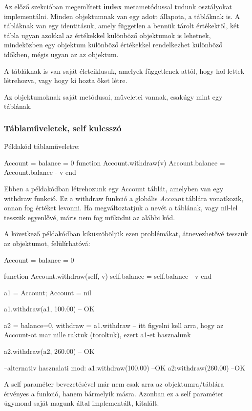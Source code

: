 Az előző szekcióban megemlített \detokenize{__}\textbf{index} metametódussal tudunk osztályokat implementálni. Minden objektumnak van egy adott állapota, a tábláknak is. A tábláknak van egy identitásuk, amely független a bennük tárolt értékektől, két tábla ugyan azokkal az értékekkel különböző objektumok is lehetnek, mindeközben egy objektum különböző értékekkel rendelkezhet különböző időkben, mégis ugyan az az objektum.
\pagebreak

A tábláknak is van saját életciklusuk, amelyek függetlenek attól, hogy hol lettek létrehozva, vagy hogy ki hozta őket létre.

Az objektumoknak saját metódusai, műveletei vannak, csakúgy mint egy táblának.

\subsubsection{Táblaműveletek, self kulcsszó}
Példakód táblaműveletre:
\begin{lua}
Account = {balance = 0}
function Account.withdraw(v)
	Account.balance = Account.balance - v
end
\end{lua}
Ebben a példakódban létrehozunk egy Account táblát, amelyben van egy withdraw funkció. Ez a withdraw funkció a globális \textit{Account} táblára vonatkozik, onnan fog értéket levonni. Ha megváltoztatjuk a nevét a táblának, vagy nil-lel tesszük egyenlővé, máris nem fog működni az alábbi kód.

A következő példakódban kiküszöböljük ezen problémákat, átnevezhetővé tesszük az objektumot, felülírhatóvá:

\begin{lua}
Account = {balance = 0}

function Account.withdraw(self, v)
	self.balance = self.balance - v
end 

a1 = Account; Account = nil

a1.withdraw(a1, 100.00)   -- OK

a2 = {balance=0, withdraw = a1.withdraw} -- itt figyelni kell arra, hogy az Account-ot mar nille raktuk (toroltuk), ezert a1-et hasznalunk 

a2.withdraw(a2, 260.00) -- OK

--alternativ hasznalati mod:
a1:withdraw(100.00) --OK
a2:withdraw(260.00) --OK
\end{lua}

A self paraméter bevezetésével már nem csak arra az objektumra/táblára érvényes a funkció, hanem bármelyik másra. Azonban ez a self paraméter úgymond saját magunk által implementált, kitalált.

